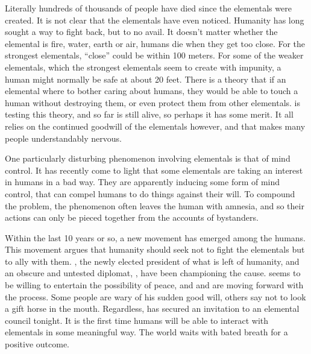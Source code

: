 \documentclass[blue]{elementals}
\begin{document}
Literally hundreds of thousands of people have died since the elementals were created. It is not clear that the elementals have even noticed. Humanity has long sought a way to fight back, but to no avail. It doesn't matter whether the elemental is fire, water, earth or air, humans die when they get too close. For the strongest elementals, ``close'' could be within 100 meters. For some of the weaker elementals, which the strongest elementals seem to create with impunity, a human might normally be safe at about 20 feet. There is a theory that if an elemental where to bother caring about humans, they would be able to touch a human without destroying them, or even protect them from other elementals. \cDiplomat{} is testing this theory, and so far is still alive, so perhaps it has some merit. It all relies on the continued goodwill of the elementals however, and that makes many people understandably nervous.

One particularly disturbing phenomenon involving elementals is that of mind control. It has recently come to light that some elementals are taking an interest in humans in a bad way. They are apparently inducing some form of mind control, that can compel humans to do things against their will. To compound the problem, the phenomenon often leaves the human with amnesia, and so their actions can only be pieced together from the accounts of bystanders.

Within the last 10 years or so, a new movement has emerged among the humans. This movement argues that humanity should seek not to fight the elementals but to ally with them. \cLeader{}, the newly elected president of what is left of humanity, and an obscure and untested diplomat, \cAvatar{}, have been championing the cause. \cAirKing{} seems to be willing to entertain the possibility of peace, and \cLeader{} and \cAvatar{} are moving forward with the process. Some people are wary of his sudden good will, others say not to look a gift horse in the mouth. Regardless, \cLeader{} has secured an invitation to an elemental council tonight. It is the first time humans will be able to interact with elementals in some meaningful way. The world waits with bated breath for a positive outcome.

\end{document}
